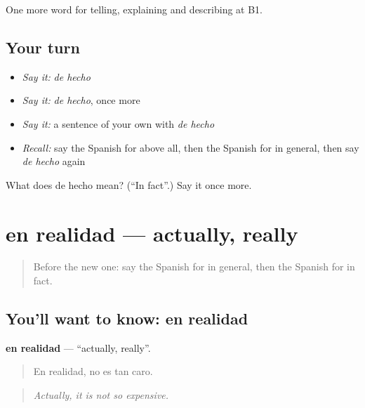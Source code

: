 \begin{grammarlens}[title={What you've built}]
One more word for telling, explaining and describing at B1.
\end{grammarlens}

\subsection*{Your turn}
\begin{itemize}
\raggedright
  \item \emph{Say it:} \emph{de hecho}
  \item \emph{Say it:} \emph{de hecho}, once more
  \item \emph{Say it:} a sentence of your own with \emph{de hecho}
  \item \emph{Recall:} say the Spanish for above all, then the Spanish for in general, then say \emph{de hecho} again
\end{itemize}

\begin{tcolorbox}[breakable,colback=teal!4,colframe=teal!35!black,title={Before you move on}]
What does de hecho mean? (\textquotedblleft{}In fact\textquotedblright{}.) Say it once more.
\end{tcolorbox}
\section[en realidad]{en realidad — actually, really}

\label{lesson:ES-C589-en-realidad}



\begin{quote}
Before the new one: say the Spanish for in general, then the Spanish for in fact.
\end{quote}

\subsection*{You'll want to know: en realidad}
\textbf{en realidad} — \textquotedblleft{}actually, really\textquotedblright{}.

\begin{quote}
En realidad, no es tan caro.
\end{quote}

\begin{quote}
\emph{Actually, it is not so expensive.}
\end{quote}

